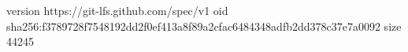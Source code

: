 version https://git-lfs.github.com/spec/v1
oid sha256:f3789728f7548192dd2f0ef413a8f89a2cfac6484348adfb2dd378c37e7a0092
size 44245
